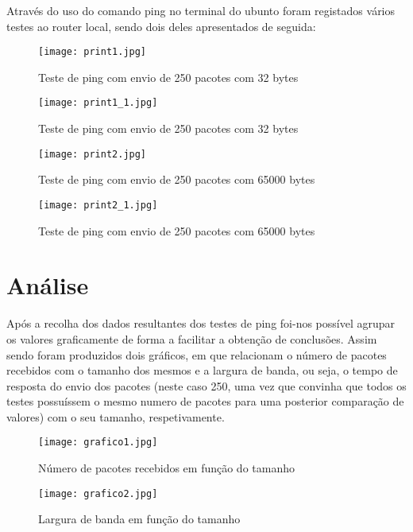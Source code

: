 \documentclass{report}
\begin{document}
\begin{Resumo}
	Através do uso do comando ping no terminal do ubunto foram registados vários testes ao router local, sendo dois deles apresentados de seguida:

 
\begin{figure}[!htp]
\centering
\texttt{[image: print1.jpg]} 
\caption{Teste de ping com envio de 250 pacotes com 32 bytes}
\end{figure}
 
\begin{figure}[!htp]
\centering
\texttt{[image: print1\_1.jpg]} 
\caption{Teste de ping com envio de 250 pacotes com 32 bytes}
\end{figure}

\begin{figure}
\centering
\texttt{[image: print2.jpg]} 
\caption{Teste de ping com envio de 250 pacotes com 65000 bytes}
\end{figure}

\begin{figure}
\centering
\texttt{[image: print2\_1.jpg]} 
\caption{Teste de ping com envio de 250 pacotes com 65000 bytes}
\end{figure}


\chapter{Análise}
\label{chap.analise}

Após a recolha dos dados resultantes dos testes de ping foi-nos possível agrupar os valores graficamente de forma a facilitar a obtenção de conclusões.
Assim sendo foram produzidos dois gráficos, em que relacionam o número de pacotes recebidos com o tamanho dos mesmos e a largura de banda, ou seja, o tempo de resposta do envio dos pacotes (neste caso 250, uma vez que convinha que todos os testes possuíssem o mesmo numero de pacotes para uma posterior comparação de valores) com o seu tamanho, respetivamente. 

\begin{figure}
\centering
\texttt{[image: grafico1.jpg]} 
\caption{Número de pacotes recebidos em função do tamanho}
\end{figure}
\begin{figure}
\centering
\texttt{[image: grafico2.jpg]} 
\caption{Largura de banda em função do tamanho}
\end{figure}


\end{Resumo}
\end{document}

